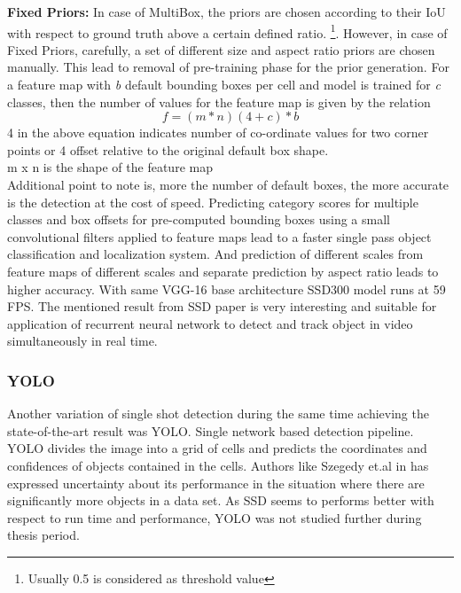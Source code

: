 \textbf{Fixed Priors:} In case of MultiBox, the priors are chosen according to their IoU with respect to ground truth above a certain defined ratio. \footnote{Usually 0.5 is considered as threshold value}.
However, in case of Fixed Priors, carefully, a set of different size and aspect ratio priors are chosen manually. This lead to removal of pre-training phase for the prior generation. For a feature map with \textit{b} default bounding boxes per cell and model is trained for \textit{c} classes, then the number of values for the feature map is given by the relation 
\begin{equation}
	f = (m * n )  (4 + c) * b
\end {equation}
4 in the above equation indicates number of co-ordinate values for two corner points or 4 offset relative to the original default box shape. \\
m x n is the shape of the feature map \\
 Additional point to note is, more the number of default boxes, the more accurate is the detection at the cost of speed.
Predicting category scores for multiple classes and box offsets for pre-computed bounding boxes using a small convolutional filters applied to feature maps lead to a faster single pass object classification and localization system. And prediction of different scales from feature maps of different scales and separate prediction by aspect ratio leads to higher accuracy. \cite{liu2016ssd} With same VGG-16 base architecture SSD300 model runs at 59 FPS. The mentioned result from SSD paper is very interesting and suitable for application of recurrent neural network to detect and track object in video simultaneously in real time.

\subsubsection{YOLO}
Another variation of single shot detection during the same time achieving the state-of-the-art result was YOLO. Single network based detection pipeline. YOLO divides the image into a grid of cells and predicts the coordinates and confidences of objects contained in the cells. Authors like Szegedy et.al in \cite{szegedy2014scalable} has expressed uncertainty about its performance in the situation where there are significantly more objects in a data set. As SSD seems to performs better with respect to run time and performance, YOLO was not studied further during thesis period.

